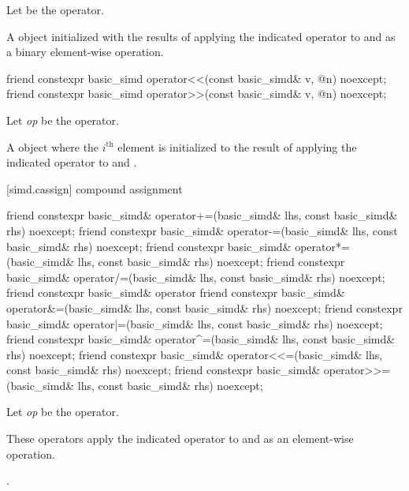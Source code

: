 \begin{itemdescr}
  \pnum Let \op{} be the operator.

  \pnum\ConstraintOperatorTWellFormed

  \pnum\returns
  A  object initialized with the results of applying the indicated operator to  and  as a binary element-wise operation.
\end{itemdescr}

\begin{itemdecl}
friend constexpr basic_simd operator<<(const basic_simd& v, @\simdsizetype@ n) noexcept;
friend constexpr basic_simd operator>>(const basic_simd& v, @\simdsizetype@ n) noexcept;
\end{itemdecl}

\begin{itemdescr}
  \pnum Let \textit{op} be the operator.

  \pnum\ConstraintOperatorTWellFormed

  \pnum\returns
  A  object where the $i^\text{th}$ element is initialized to the result of applying the indicated operator to  and  \foralli.
\end{itemdescr}

[simd.cassign]{ compound assignment}

\begin{itemdecl}
friend constexpr basic_simd& operator+=(basic_simd& lhs, const basic_simd& rhs) noexcept;
friend constexpr basic_simd& operator-=(basic_simd& lhs, const basic_simd& rhs) noexcept;
friend constexpr basic_simd& operator*=(basic_simd& lhs, const basic_simd& rhs) noexcept;
friend constexpr basic_simd& operator/=(basic_simd& lhs, const basic_simd& rhs) noexcept;
friend constexpr basic_simd& operator%
friend constexpr basic_simd& operator&=(basic_simd& lhs, const basic_simd& rhs) noexcept;
friend constexpr basic_simd& operator|=(basic_simd& lhs, const basic_simd& rhs) noexcept;
friend constexpr basic_simd& operator^=(basic_simd& lhs, const basic_simd& rhs) noexcept;
friend constexpr basic_simd& operator<<=(basic_simd& lhs, const basic_simd& rhs) noexcept;
friend constexpr basic_simd& operator>>=(basic_simd& lhs, const basic_simd& rhs) noexcept;
\end{itemdecl}

\begin{itemdescr}
  \pnum Let \textit{op} be the operator.

  \pnum\ConstraintOperatorTWellFormed

  \pnum\effects
  These operators apply the indicated operator to  and  as an element-wise operation.

  \pnum\returns
  .
\end{itemdescr}

